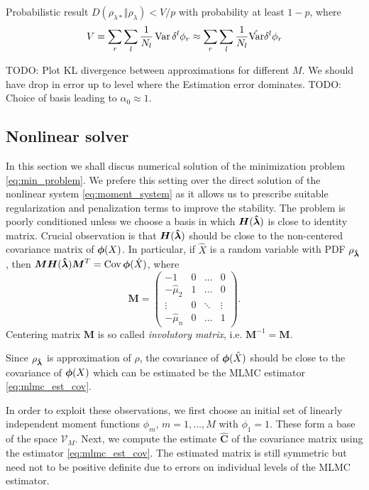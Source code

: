 \documentclass{article}
\def\tn#1{\boldsymbol{#1}}
\def\todo#1{{\color{red}TODO: #1}}
\def\Var{\mathop{\rm Var}}
\def\Cov{\mathop{\rm Cov}}
\begin{document}
Probabilistic result $D(\rho_{\lambda*} \Vert \rho_{\lambda}) < V/p$
with probability at least $1-p$, where 
\[
    V = \sum_r \sum_l \frac{1}{N_l} \Var \delta^l\phi_r \approx \sum_r \sum_l \frac{1}{N_l} \hat{\Var} \delta^l\phi_r 
\]

\todo{Plot KL divergence between approximations for different $M$. We should have drop in error up to level where the Estimation error dominates.}
\todo{Choice of basis leading to $\alpha_0 \approx 1$.}

\subsection{Nonlinear solver}

In this section we shall discus numerical solution of the minimization problem \eqref{eq:min_problem}. We prefere this setting over the direct solution of the nonlinear system \eqref{eq:moment_system} as it allows us to prescribe suitable regularization and penalization terms to improve the stability.
The problem is poorly conditioned unless we choose a basis in which $\tn H(\estvl)$ is close to identity matrix. Crucial observation is that $\tn H(\estvl)$ should be close to the non-centered 
covariance matrix of  $\mathbf{\boldsymbol{\phi}}(X)$. In particular, if $\hat X$ is a random variable with PDF $\rho_{{\mathbf{\boldsymbol{\hat\lambda}}}}$, then $\tn M \tn H(\estvl) \tn M^T = \Cov \vphi(\hat X)$, where 
\[
  \tn M = 
  \begin{pmatrix}
    -1    & 0 &\dots &0\\
    -\hat\mu_2    & 1 &\dots &0\\
    \vdots& 0 &\ddots      &\vdots\\
    -\hat\mu_n    & 0 &\dots &1
  \end{pmatrix}.
\]
Centering matrix $\tn M$ is so called \emph{involutory matrix}, i.e. $\tn M^{-1} = \tn M$.


Since $\rho_{{\mathbf{\boldsymbol{\hat\lambda}}}}$ is approximation of $\rho$, the covariance of $\mathbf{\boldsymbol{\phi}}(\hat X)$ should be close to the covariance of $\mathbf{\boldsymbol{\phi}}(X)$ which can be estimated be the MLMC estimator \eqref{eq:mlmc_est_cov}.

In order to exploit these observations, we first choose an initial set of linearly independent 
moment functions $\phi_m$, $m=1,\dots,M$ with $\phi_1=1$. These form a base of the space $\mathcal V_M$.
Next, we compute the estimate $\hat{\tn C}$ of the covariance matrix using the estimator \eqref{eq:mlmc_est_cov}. The estimated matrix is still symmetric but need not to be positive definite
due to errors on individual levels of the MLMC estimator. 
\end{document}

